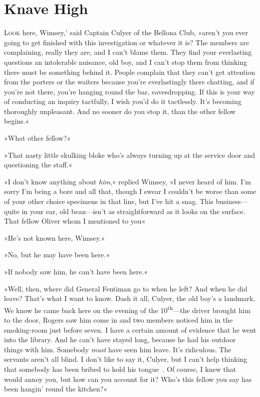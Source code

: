 \chapter{Knave High}

\lettrine[lines=4,ante=‘]{L}{ook} here, Wimsey,' said Captain Culyer of the Bellona Club, »aren't you ever going to get finished with this investigation or whatever it is? The members are complaining, really they are, and I can't blame them. They find your everlasting questions an intolerable nuisance, old boy, and I can't stop them from thinking there must be something behind it. People complain that they can't get attention from the porters or the waiters because you're everlastingly there chatting, and if you're not there, you're hanging round the bar, eavesdropping. If this is your way of conducting an inquiry tactfully, I wish you'd do it tactlessly. It's becoming thoroughly unpleasant. And no sooner do you stop it, than the other fellow begins.«

»What other fellow?«

»That nasty little skulking bloke who's always turning up at the service door and questioning the staff.«

»I don't know anything about \textit{him},« replied Wimsey, »I never heard of him. I'm sorry I'm being a bore and all that, though I swear I couldn't be worse than some of your other choice specimens in that line, but I've hit a snag. This business—quite in your ear, old bean—isn't as straightforward as it looks on the surface. That fellow Oliver whom I mentioned to you\longdash«

»He's not known here, Wimsey.«

»No, but he may have been here.«

»If nobody saw him, he can't have been here.«

»Well, then, where did General Fentiman go to when he left? And when he did leave? That's what I want to know. Dash it all, Culyer, the old boy's a landmark. We know he came back here on the evening of the  10\textsuperscript{th}—the driver brought him to the door, Rogers saw him come in and two members noticed him in the smoking-room just before seven. I have a certain amount of evidence that he went into the library. And he can't have stayed long, because he had his outdoor things with him. Somebody \textit{must} have seen him leave. It's ridiculous. The servants aren't all blind. I don't like to say it, Culyer, but I can't help thinking that somebody has been bribed to hold his tongue\textellipsis~. Of course, I knew that would annoy you, but how can you account for it? Who's this fellow you say has been hangin' round the kitchen?«

